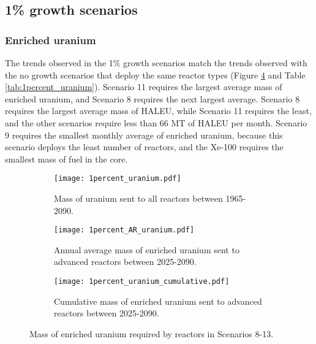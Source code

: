 \subsection{1\% growth scenarios}
\subsubsection{Enriched uranium}
The trends observed in the 1\% growth scenarios match the trends 
observed with the no growth scenarios that deploy the same reactor 
types
(Figure \ref{fig:1percent_uranium} and Table \ref{tab:1percent_uranium}). 
Scenario 11 requires the largest average mass of enriched uranium, and Scenario
8 requires the next largest average. Scenario 8 requires the largest 
average mass of \gls{HALEU}, while Scenario 11 requires the least, and the 
other scenarios require less than 66 MT of \gls{HALEU} per month. Scenario 
9 requires the 
smallest monthly average of enriched uranium, because this scenario 
deploys the least number of reactors, and the Xe-100 requires the smallest 
mass of fuel in the core. 

\begin{figure}[h!]
    \centering
    \begin{subfigure}[b]{0.45\textwidth}
        \centering
        \texttt{[image: 1percent\_uranium.pdf]}
        \caption{Mass of uranium sent to all reactors between 1965-2090.}
        \label{fig:1percent_all_uranium}
    \end{subfigure}
    \hfill
    \begin{subfigure}[b]{0.45\textwidth}
        \centering
        \texttt{[image: 1percent\_AR\_uranium.pdf]}
        \caption{Annual average mass of enriched uranium sent to 
        advanced reactors between 2025-2090.}
        \label{fig:1percent_AR_uranium}
    \end{subfigure}
    \begin{subfigure}[b]{0.45\textwidth}
        \centering
        \texttt{[image: 1percent\_uranium\_cumulative.pdf]}
        \caption{Cumulative mass of enriched uranium sent to advanced reactors 
        between 2025-2090.}
        \label{fig:1percent_uranium_cumulative}
    \end{subfigure}
       \caption{Mass of enriched uranium required by reactors
        in Scenarios 8-13.}
       \label{fig:1percent_uranium}
\end{figure}

